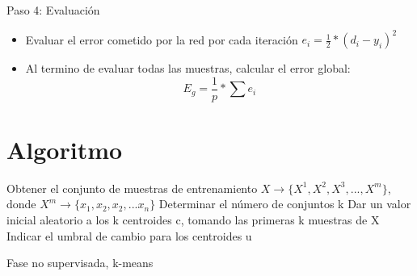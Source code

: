 \documentclass[
	11pt, %
]{beamer}
\begin{document}
\begin{frame}
  Paso 4: Evaluación
  
  \bigskip %

  \begin{itemize}
  \item Evaluar el error cometido por la red por cada iteración $e_{i} = \frac{1}{2}*(d_{i}-y_{i})^{2}$

    \bigskip %
    
  \item Al termino de evaluar todas las muestras, calcular el error global:
    \[ E_{g} = \frac{1}{p} * \sum e_{i}\]
  \end{itemize}
\end{frame}

\section{Algoritmo}
\begin{frame}
  \begin{algorithm}[H]
    \algsetup{\tiny}
  \scriptsize
    \SetAlgoLined
    Obtener el conjunto de muestras de entrenamiento $X \rightarrow \{X^1,X^2,X^3,...,X^m\}$, donde $X^{m} \rightarrow \{x_1,x_2,x_2,...x_n\}$\;
    Determinar el número de conjuntos k\;
    Dar un valor inicial aleatorio a los k centroides c, tomando las primeras k muestras de X\;
    Indicar el umbral de cambio para los centroides u\;
    \caption{Fase no supervisada, k-means}
  \end{algorithm}
\end{frame}
\end{document}
